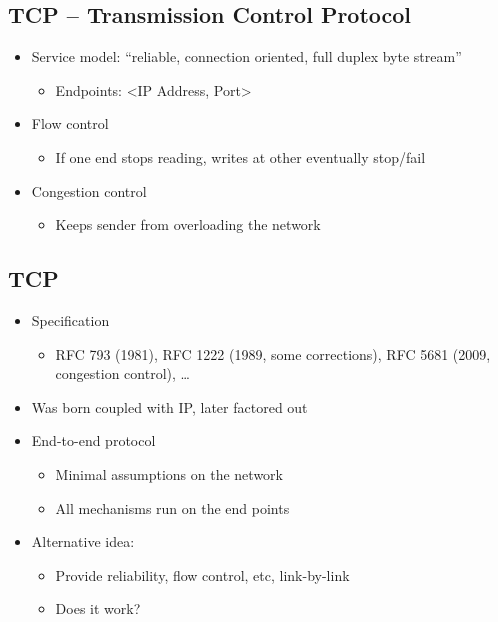 \subsection{TCP -- Transmission Control Protocol}
\begin{itemize}[nosep]
    \item Service model: ``reliable, connection oriented, full duplex byte stream''
          \begin{itemize}[nosep]
              \item Endpoints: <IP Address, Port>
          \end{itemize}
    \item Flow control
          \begin{itemize}[nosep]
              \item If one end stops reading, writes at other eventually stop/fail
          \end{itemize}
    \item Congestion control
          \begin{itemize}[nosep]
              \item Keeps sender from overloading the network
          \end{itemize}
\end{itemize}
\subsection{TCP}
\begin{itemize}[nosep]
    \item Specification
          \begin{itemize}[nosep]
              \item RFC 793 (1981), RFC 1222 (1989, some corrections), RFC 5681 (2009, congestion control), \dots
          \end{itemize}
    \item Was born coupled with IP, later factored out
    \item End-to-end protocol
          \begin{itemize}[nosep]
              \item Minimal assumptions on the network
              \item All mechanisms run on the end points
          \end{itemize}
    \item Alternative idea:
          \begin{itemize}[nosep]
              \item Provide reliability, flow control, etc, link-by-link
              \item Does it work?
          \end{itemize}
\end{itemize}
